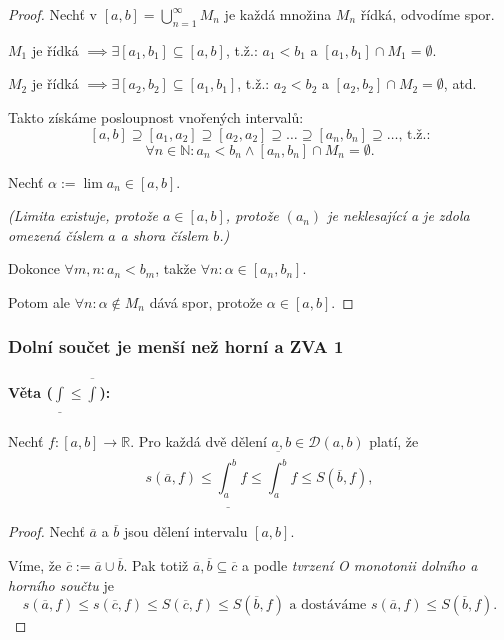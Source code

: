 \documentclass[10pt,a4paper]{article}
\newcommand{\N}{{\mathbb{N}}}
\newcommand{\R}{{\mathbb{R}}}
\begin{document}
\begin{proof}
    Nechť v $[a,b] = \displaystyle \bigcup_{n=1}^{\infty} M_n$ je každá množina $M_n$ řídká, odvodíme spor.

    $M_1$ je řídká $\implies \exists [a_1, b_1] \subseteq [a, b]$, t.ž.: $a_1 < b_1$ a 
    $[a_1 , b_1 ] \cap M_1 = \emptyset$. 
    
    $M_2$ je řídká $\implies \exists [a_2, b_2] \subseteq [a_1, b_1]$, t.ž.: $a_2 < b_2$ a $[a_2 , b_2] \cap M_2 = \emptyset$, atd. 
    
    Takto získáme posloupnost vnořených intervalů:
    \[
        [a,b] \supseteq [a_1, a_2] \supseteq [a_2, a_2] \supseteq \dots \supseteq [a_n, b_n] \supseteq \dots \text{, t.ž.:}
    \]
    $$\forall n\in \N: a_n < b_n \land [a_n, b_n] \cap M_n = \emptyset.$$
    
    Nechť $\alpha := \lim a_n \in [a, b]$. 

    \textit{(Limita existuje, protože $a\in [a, b]$, protože $(a_n)$ je neklesající a je zdola omezená číslem $a$ a shora číslem $b$.)} 
    
    Dokonce $\forall m,n: a_n < b_m$, takže $\forall n: \alpha\in [a_n , b_n]$.

    Potom ale $\forall n: \alpha \notin M_n$ dává spor, protože $\alpha \in [a, b]$.
\end{proof}

\subsubsection{Dolní součet je menší než horní a ZVA 1}

\paragraph*{Věta ($\underline{\int} \leq \overline{\int}$):} 
Nechť $f:[a, b] \to \R$. Pro každá dvě dělení $a, b \in \mathcal{D}(a, b)$ platí, že \[
    s(\overline{a}, f) \leq \underline{\int_a^b}f \leq \overline{\int_a^b}f \leq S(\overline{b}, f),
\]

\begin{proof}
    Nechť $\overline{a}$ a $\overline{b}$ jsou dělení intervalu $[a, b]$.
    
    Víme, že $\overline{c} := \overline{a} \cup \overline{b}$. 
    Pak totiž $\overline{a}, \overline{b} \subseteq \overline{c}$ a podle \textit{tvrzení O monotonii dolního a horního součtu} je
    \[
        s(\overline{a}, f)\leq s(\overline{c}, f) \leq S(\overline{c},f) \leq S(\overline{b}, f) \text{ a dostáváme } s(\overline{a}, f) \leq S(\overline{b}, f).
    \]
\end{proof}
\end{document}
